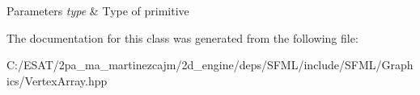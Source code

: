\begin{DoxyParams}{Parameters}
{\em type} & Type of primitive \\
\hline
\end{DoxyParams}


The documentation for this class was generated from the following file\+:\begin{DoxyCompactItemize}
\item 
C\+:/\+E\+S\+A\+T/2pa\+\_\+ma\+\_\+martinezcajm/2d\+\_\+engine/deps/\+S\+F\+M\+L/include/\+S\+F\+M\+L/\+Graphics/Vertex\+Array.\+hpp\end{DoxyCompactItemize}
